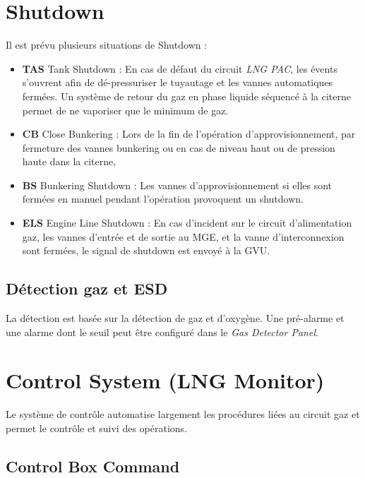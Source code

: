 \documentclass[12pt,a4paper]{article}
\begin{document}
\section{Shutdown}

Il est prévu plusieurs situations de Shutdown :
\begin{itemize}
 \item \textbf{TAS} Tank Shutdown : En cas de défaut du circuit \emph{LNG PAC}, les évents s'ouvrent afin de dé-pressuriser le tuyautage et les vannes automatiques fermées. Un système de retour du gaz en phase liquide séquencé à la citerne permet de ne vaporiser que le minimum de gaz.  
 \item \textbf{CB} Close Bunkering : Lors de la fin de l'opération d'approvisionnement, par fermeture des vannes bunkering ou en cas de niveau haut ou de pression haute dans la citerne, 
 \item \textbf{BS} Bunkering Shutdown : Les vannes d'approvisionnement si elles sont fermées en manuel pendant l'opération provoquent un shutdown.
 \item \textbf{ELS} Engine Line Shutdown : En cas d'incident sur le circuit d'alimentation gaz, les vannes d'entrée et de sortie au MGE, et la vanne d'interconnexion sont fermées, le signal de shutdown est envoyé à la GVU.
 
\end{itemize}

%
%
\subsection{Détection gaz et ESD}

La détection est basée sur la détection de gaz et d'oxygène. Une pré-alarme et une alarme dont le seuil peut être configuré dans le \emph{Gas Detector Panel}. 


\section{ Control System (LNG Monitor)
}

Le système de contrôle automatise largement les procédures liées au circuit gaz et permet le contrôle et suivi des opérations.


\subsection{Control Box Command}
\end{document}
